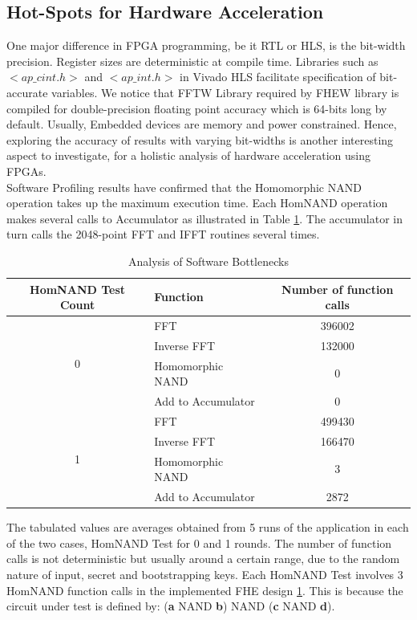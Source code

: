 \subsection{Hot-Spots for Hardware Acceleration}
\label{4_1_2}
One major difference in FPGA programming, be it RTL or HLS, is the bit-width precision. Register sizes are deterministic at compile time. Libraries such as $<ap\_cint.h>$ and $<ap\_int.h>$ in Vivado HLS facilitate specification of bit-accurate variables.  We notice that FFTW Library required by FHEW library is compiled for double-precision floating point accuracy which is 64-bits long by default. Usually, Embedded devices are memory and power constrained. Hence, exploring the accuracy of results with varying bit-widths is another interesting aspect to investigate, for a holistic analysis of hardware acceleration using FPGAs.\\
Software Profiling results have confirmed that the Homomorphic NAND operation takes up the maximum execution time. Each HomNAND operation makes several calls to Accumulator as illustrated in Table \ref{table:sw_hotspots_fhe}. The accumulator in turn calls the 2048-point FFT and IFFT routines several times.
\begin{table}[htbp]
\caption{Analysis of Software Bottlenecks}
\centering
\begin{tabular}{c p{4.5cm} c}
\toprule
HomNAND Test Count & Function & Number of function calls\\
\midrule
\multirow{4}{*}{0}&FFT&396002\\
\cmidrule(r{4pt}){2-3}
  &Inverse FFT&132000\\
\cmidrule(r{4pt}){2-3}
 &Homomorphic NAND&0\\
\cmidrule(r{4pt}){2-3}
 &Add to Accumulator&0\\
\midrule
\multirow{4}{*}{1}&FFT&499430\\
\cmidrule(r{4pt}){2-3}
 &Inverse FFT&166470\\
\cmidrule(r{4pt}){2-3}
 &Homomorphic NAND&3\\
\cmidrule(r{4pt}){2-3}
 &Add to Accumulator&2872\\
\bottomrule
\end{tabular}
\label{table:sw_hotspots_fhe}
\end{table}
The tabulated values are averages obtained from 5 runs of the application in each of the two cases, HomNAND Test for 0 and 1 rounds. The number of function calls is not deterministic but usually around a certain range, due to the random nature of input, secret and bootstrapping keys. Each HomNAND Test involves 3 HomNAND function calls in the implemented FHE design \cite{fhew_lib} \ref{table:sw_hotspots_fhe}. This is because the circuit under test is defined by: (\textbf{a} NAND \textbf{b}) NAND (\textbf{c} NAND \textbf{d}).
